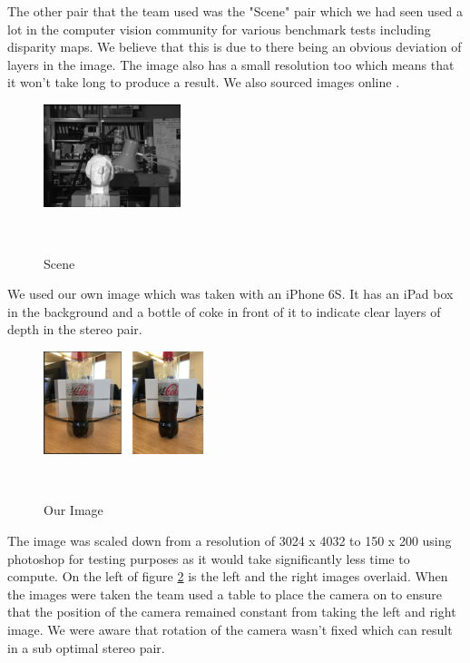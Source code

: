 \documentclass[twocolumn]{article}
\begin{document}
The other pair that the team used was the "Scene" pair which we had seen used a lot in the computer vision community \cite{sceneusage} \cite{sceneusage2} for various benchmark tests including disparity maps. We believe that this is due to there being an obvious deviation of layers in the image. The image also has a small resolution too which means that it won't take long to produce a result. We also sourced images online \cite{dataset}.  

\begin{figure}[H]
\centering
  \includegraphics[width=40mm]{Figures/scene}
    \caption{Scene}~\label{fig:scene}
\end{figure} 

We used our own image which was taken with an iPhone 6S. It has an iPad box in the background and a bottle of coke in front of it to indicate clear layers of depth in the stereo pair.

\begin{figure}[H]
\centering
  \includegraphics[height=30mm]{Figures/Coke_Image}
    \caption{Our Image}~\label{fig:CokeScene}
\end{figure} 

The image was scaled down from a resolution of 3024 x 4032 to 150 x 200 using photoshop for testing purposes as it would take significantly less time to compute. On the left of figure \ref{fig:CokeScene} is the left and the right images overlaid. When the images were taken the team used a table to place the camera on to ensure that the position of the camera remained constant from taking the left and right image. We were aware that rotation of the camera wasn't fixed which can result in a sub optimal stereo pair.  


\end{document}
